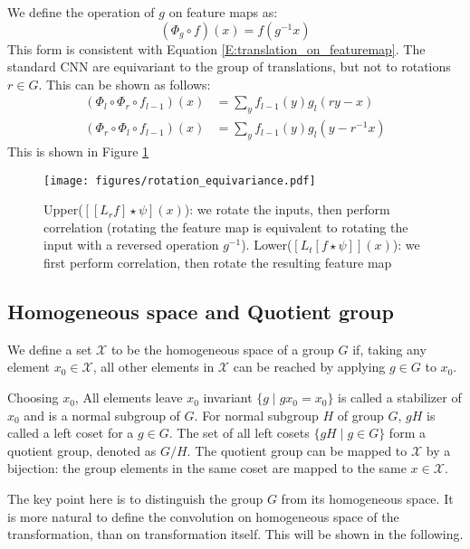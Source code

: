 \documentclass{article}
\newcommand{\calx}{\mathcal{X}}
\begin{document}
We define the operation of $g$ on feature maps as: 
\begin{equation}
    \label{E:g_on_featuremap}
    (\Phi_g \circ f) (x) = f(g^{-1}x)
\end{equation}
This form is consistent with Equation \eqref{E:translation_on_featuremap}.
The standard CNN are equivariant to the group of translations, but not to rotations $r\in G$. This can be shown as follows:
\begin{align*}
    (\Phi_l \circ \Phi_r \circ f_{l-1}) (x) &= \sum_{y} f_{l-1}(y) g_l(ry-x) \\
    (\Phi_r \circ \Phi_l \circ f_{l-1}) (x) &= \sum_{y} f_{l-1}(y) g_l(y-r^{-1}x)
\end{align*}
This is shown in Figure \ref{F:rotation_is_not_equivariance}
\begin{figure}[h!]
    \centering
    \texttt{[image: figures/rotation\_equivariance.pdf]}
    \caption{
        Upper($[[L_r f]\star \psi] (x)$): we rotate the inputs, then perform correlation (rotating the feature map is equivalent to rotating the input with a reversed operation $g^{-1}$).
        Lower($[L_t[f\star \psi] ] (x)$): we first perform correlation, then rotate the resulting feature map }
    \label{F:rotation_is_not_equivariance}
\end{figure}

\subsection*{Homogeneous space and Quotient group}
We define a set $\calx$ to be the homogeneous space of a group $G$ if, taking any element $x_0\in \calx$,
all other elements in $\calx$ can be reached by applying $g\in G$ to $x_0$. 

Choosing $x_0$, All elements leave $x_0$ invariant $\{g\mid gx_0 = x_0\}$ is called a stabilizer of $x_0$ and is 
a normal subgroup of $G$. 
For normal subgroup $H$ of group $G$, $gH$ is called a left coset for a $g\in G$. 
The set of all left cosets $\{gH\mid g \in G\}$ form a quotient group, denoted as $G/H$.
The quotient group can be mapped to $\calx$ by a bijection: 
the group elements in the same coset are mapped to the same $x\in \calx$.

The key point here is to distinguish the group $G$ from its homogeneous space. It is more natural to define 
the convolution on homogeneous space of the transformation, than on transformation itself. This will be 
shown in the following.
\end{document}
